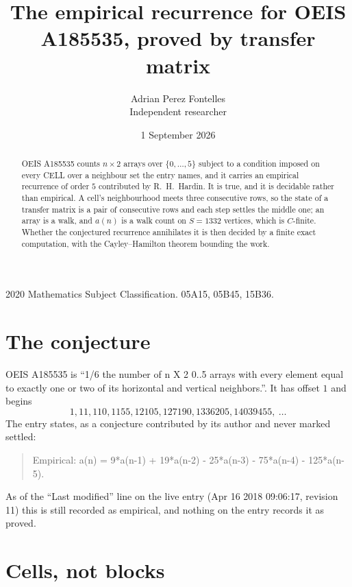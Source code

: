 \documentclass[11pt,a4paper]{article}
\title{The empirical recurrence for OEIS A185535, proved by transfer matrix}
\author{Adrian Perez Fontelles\\ \small Independent researcher}
\date{1 September 2026}
\theoremstyle{plain}
\theoremstyle{definition}
\begin{document}
\maketitle

\begin{abstract}
OEIS A185535 counts $n\times2$ arrays over $\{0,\dots,5\}$ subject to a condition imposed on
every CELL over a neighbour set the entry names, and it carries an empirical recurrence of
order $5$ contributed by R.~H.~Hardin. It is true, and it is decidable rather than
empirical. A cell's neighbourhood meets three consecutive rows, so the state of a transfer
matrix is a pair of consecutive rows and each step settles the middle one; an array is a
walk, and $a(n)$ is a walk count on $S=1332$ vertices, which is $C$-finite. Whether the
conjectured recurrence annihilates it is then decided by a finite exact computation, with the
Cayley--Hamilton theorem bounding the work.
\end{abstract}

\noindent\small 2020 Mathematics Subject Classification. 05A15, 05B45, 15B36.\normalsize

\section{The conjecture}

OEIS A185535 is ``1/6 the number of n X 2 0..5 arrays with every element equal to exactly one or two of its horizontal and vertical neighbors.''. It has offset $1$ and begins
\[
1, 11, 110, 1155, 12105, 127190, 1336205, 14039455,\ \dots
\]
The entry states, as a conjecture contributed by its author and never marked settled:
\begin{quote}
Empirical: a(n) = 9*a(n-1) + 19*a(n-2) - 25*a(n-3) - 75*a(n-4) - 125*a(n-5).
\end{quote}
As of the ``Last modified'' line on the live entry (Apr 16 2018 09:06:17, revision 11) this is still
recorded as empirical, and nothing on the entry records it as proved.

\section{Cells, not blocks}
\end{document}
